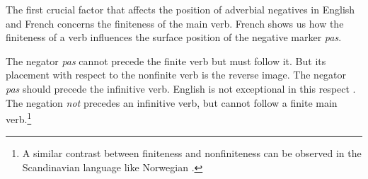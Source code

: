 \documentclass[output=paper]{langsci/langscibook}
\begin{document}
{%

The first crucial factor that affects  the position of adverbial
negatives in English and French concerns the finiteness of the main verb.
French shows us how the finiteness of a verb influences the
surface position of the negative marker \textit{pas}.



\eal{}
\zl


\eal{}
\zl

\noindent
The negator \textit{pas} cannot precede the finite verb
but must follow it. But its placement with respect to
the nonfinite verb is the reverse image. The negator \textit{pas}
should precede the infinitive verb.
English is not exceptional in this respect \citep{Baker:89,Baker:91,Ernst:92}.
The negation \textit{not} precedes an infinitive verb, but cannot follow
a finite main verb.\footnote{A similar contrast between finiteness and
nonfiniteness can be observed in the Scandinavian language like Norwegian \citep[see][]{Platzack:86,HP:88,Vikner:94,Vikner:97}.}

\eal{}
\zl

\begin{exe}
\ex\label{eng-fin-neg} \begin{xlist}
\zl


\end{xlist}
\end{exe}}
\end{document}
